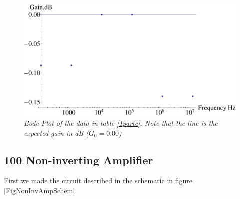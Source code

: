 \documentclass[11pt]{article}
\numberwithin{equation}{section}
\numberwithin{figure}{section}
\numberwithin{table}{section}
\begin{document}
\begin{figure}[h]
\centering
\includegraphics[scale=0.60]{PlotVoltFollow.eps}
\caption{\textit{Bode Plot of the data in table \ref{1partc}. Note that the line is the expected gain in dB ($G_0=0.00$)}}
\label{PlotVoltFollow}
\end{figure}

\subsection{100 Non-inverting Amplifier} 
First we made the circuit described in the schematic in figure \ref{FigNonInvAmpSchem}
\end{document}
